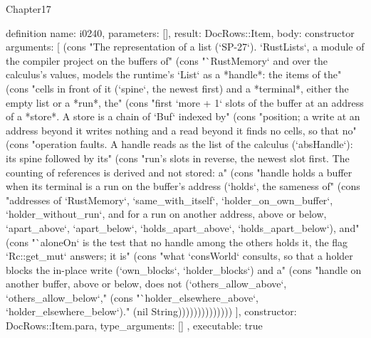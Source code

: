\begin{lexlean}{Chapter17}
\begin{semanticmodule}
definition{
  name: i0240,
  parameters: [],
  result: DocRows::Item,
  body: constructor{
    arguments: [
      (cons "The representation of a list (`SP-27`). `RustLists`, a module of the compiler project on the buffers of" (cons "`RustMemory` and over the calculus's values, models the runtime's `List` as a *handle*: the items of the" (cons "cells in front of it (`spine`, the newest first) and a *terminal*, either the empty list or a *run*, the" (cons "first `more + 1` slots of the buffer at an address of a *store*. A store is a chain of `Buf` indexed by" (cons "position; a write at an address beyond it writes nothing and a read beyond it finds no cells, so that no" (cons "operation faults. A handle reads as the list of the calculus (`absHandle`): its spine followed by its" (cons "run's slots in reverse, the newest slot first. The counting of references is derived and not stored: a" (cons "handle holds a buffer when its terminal is a run on the buffer's address (`holds`, the sameness of" (cons "addresses of `RustMemory`, `same_with_itself`, `holder_on_own_buffer`, `holder_without_run`, and for a run on another address, above or below, `apart_above`, `apart_below`, `holds_apart_above`, `holds_apart_below`), and" (cons "`aloneOn` is the test that no handle among the others holds it, the flag `Rc::get_mut` answers; it is" (cons "what `consWorld` consults, so that a holder blocks the in-place write (`own_blocks`, `holder_blocks`) and a" (cons "handle on another buffer, above or below, does not (`others_allow_above`, `others_allow_below`," (cons "`holder_elsewhere_above`, `holder_elsewhere_below`)." (nil String))))))))))))))
    ],
    constructor: DocRows::Item.para,
    type_arguments: []
  },
  executable: true
}


\end{semanticmodule}
\end{lexlean}
